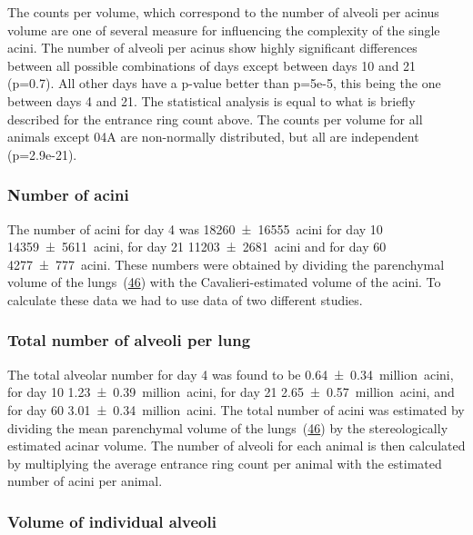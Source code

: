 \documentclass[
  american,
]{article}
\begin{document}
The counts per volume, which correspond to the number of alveoli per acinus volume are one of several measure for influencing the complexity of the single acini.
The number of alveoli per acinus show highly significant differences between all possible combinations of days except between days 10 and 21 (p=0.7).
All other days have a p-value better than p=5e-5, this being the one between days 4 and 21.
The statistical analysis is equal to what is briefly described for the entrance ring count above.
The counts per volume for all animals except 04A are non-normally distributed, but all are independent (p=2.9e-21).

\hypertarget{number-of-acini}{%
\subsubsection{Number of acini}\label{number-of-acini}}

The number of acini for day 4 was 18260~±~16555~acini for day 10 14359~±~5611~acini, for day 21 11203~±~2681~acini and for day 60 4277~±~777~acini.
These numbers were obtained by dividing the parenchymal volume of the lungs~(\protect\hyperlink{ref-wnl86DEM}{46}) with the Cavalieri-estimated volume of the acini.
To calculate these data we had to use data of two different studies.

\hypertarget{total-number-of-alveoli-per-lung}{%
\subsubsection{Total number of alveoli per lung}\label{total-number-of-alveoli-per-lung}}

The total alveolar number for day 4 was found to be 0.64~±~0.34~million~acini, for day 10 1.23~±~0.39~million~acini, for day 21 2.65~±~0.57~million~acini, and for day 60 3.01~±~0.34~million~acini.
The total number of acini was estimated by dividing the mean parenchymal volume of the lungs~(\protect\hyperlink{ref-wnl86DEM}{46}) by the stereologically estimated acinar volume.
The number of alveoli for each animal is then calculated by multiplying the average entrance ring count per animal with the estimated number of acini per animal.

\hypertarget{volume-of-individual-alveoli}{%
\subsubsection{Volume of individual alveoli}\label{volume-of-individual-alveoli}}
\end{document}
